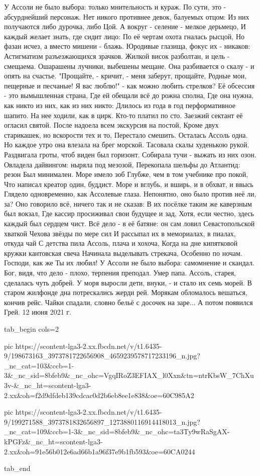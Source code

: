 У Ассоли не было выбора: 
только мнительность и кураж.
По сути, это - абсурднейший персонаж.
Нет никого противнее девок, балуемых отцом:
Из них получаются либо дурочка, либо Цой.
А вокруг - селение - мелкое дерьмецо,
И каждый желает знать, где сидит лицо:
По её чертам охота гналась рысцой,
Но фазан исчез, а вместо мишени - блажь.
Юродивые глазища, фокус их - никаков:
Астигматизм разъезжающихся зрачков.
Жилкой висок разболтан, и цель - смещаема.
Ошарашены лучники, выбешены мещане.
Она разбивается о скалу - и опять на счастье.
"Прощайте, - кричит, - меня заберут, прощайте,
Родные мои, пещерные и песчаные!
Я вас люблю!" - как можно любить стрелков?
Её обсессия - это вымышленная страна,
Где ей обещали всё до рожна сполна,
Где она нужна, как никто из них, как из них никто:
Длилось из года в год перформативное шапито.
На нее ходили, как в цирк. Кто-то платил по сто.
Заезжий сектант её огласил святой.
После надоела всем экскурсия на постой,
Кроме двух старикашек, но вскорости тех и то,
Перестало смешить. Осталась Ассоль одна.
Но каждое утро она влезала на брег морской.
Тасовала скалы худенькою рукой.
Раздвигала гроты, чтоб виден был горизонт.
Собирала тучи - выжать из них озон.
Овладела дайвингом: ныряла под мезозой,
Перекопала шельфы до Атлантид: резон
Был минимален. Море имело зоб
Глубже, чем в том учебнике про покой,
Что написал креатор один, буддист.
Море и вглубь, и вширь, и в обхват, и ввысь
Глядело одновременно, как Ассолевые глаза.
Непонятно, оно было против неё ли, за?
Оно говорило всё, ничего так и не сказав:
В их посёлке таким же каверзным был вокзал,
Где кассир просиживал свои будущее и зад,
Хотя, если честно, здесь каждый был сердцем чист.
Всё дело - в её батяне: он сам ловил
Севастопольской хваткой Чехова звёзды по мере сил
И рассыпал их в мемориалах, в пиалах, откуда чай
С детства пила Ассоль, плача и хохоча,
Когда на дне кипятковой кружки кантовская свеча
Начинала выделывать стрекача,
Особенно по ночам.
Господи, как же Ты их любил!
У Ассоли не было выбора: самомнение и скандал.
Бог, видя, что дело - плохо, терпения преподал.
Умер папа. Ассоль, старея, сделалась чуть добрей.
У моря выросли дети, внуки, - и стало их семь морей.
В старом жилфонде дна потрескались жерди рей.
Морякам обломалось вешаться, кончив рейс.
Чайки спадали, словно бельё с досочек на заре...
А потом появился Грей.
12 июня 2021 г.

\ifcmt
  tab_begin cols=2

     pic https://scontent-lga3-2.xx.fbcdn.net/v/t1.6435-9/198673163_3973781722656908_4659239578717233196_n.jpg?_nc_cat=103&ccb=1-3&_nc_sid=8bfeb9&_nc_ohc=VgqIRoZ3EFIAX_l0Xxn&tn=ntrKbsW_7ChXu3v-&_nc_ht=scontent-lga3-2.xx&oh=f2d9dfdeb139cdcac0d2b6eb8ee1e838&oe=60C985A2

     pic https://scontent-lga3-2.xx.fbcdn.net/v/t1.6435-9/199271588_3973781832656897_1273880116914418013_n.jpg?_nc_cat=109&ccb=1-3&_nc_sid=8bfeb9&_nc_ohc=ta3Ty9wRaSgAX-kPGFz&_nc_ht=scontent-lga3-2.xx&oh=91e56b012e6ad66b1a96f37e9b1fb593&oe=60CA0244

  tab_end
\fi

